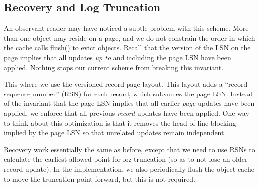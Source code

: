 \documentclass[10pt,letterpaper,twocolumn,english]{article}
\newcommand{\yad}{Lemon\xspace}
\begin{document}
\subsection{Recovery and Log Truncation}

An observant reader may have noticed a subtle problem with this
scheme.  More than one object may reside on a page, and we do not
constrain the order in which the cache calls flush() to evict objects.
Recall that the version of the LSN on the page implies that all
updates {\em up to} and including the page LSN have been applied.
Nothing stops our current scheme from breaking this invariant.  

This where we use the versioned-record page layout. This layout adds a
``record sequence number'' (RSN) for each record, which subsumes the
page LSN.  Instead of the invariant that the page LSN implies that all
earlier {\em page} updates have been applied, we enforce that all
previous {\em record} updates have been applied.  One way to think about
this optimization is that it removes the head-of-line blocking implied
by the page LSN so that unrelated updates remain independent.

Recovery work essentially the same as before, except that we need to
use RSNs to calculate the earliest allowed point for log truncation
(so as to not lose an older record update).  In the implementation, we
also periodically flush the object cache to move the truncation point
forward, but this is not required.



\end{document}
